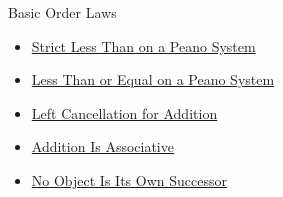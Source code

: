 \begin{topicbox}{Basic Order Laws}
\begin{dependencies}
\begin{itemize}
  \item \hyperref[def:strict-less-than-on-peano-system]{Strict Less Than on a Peano System}
  \item \hyperref[def:less-than-or-equal-on-peano-system]{Less Than or Equal on a Peano System}
  \item \hyperref[thm:addition-left-cancellation]{Left Cancellation for Addition}
  \item \hyperref[thm:addition-associative]{Addition Is Associative}
  \item \hyperref[thm:no-object-is-its-own-successor]{No Object Is Its Own Successor}
\end{itemize}
\end{dependencies}
\end{topicbox}

